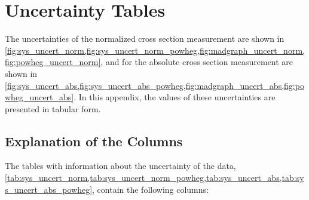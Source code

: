\chapter{Uncertainty Tables}
\label{app:uncertainty_tables}

The uncertainties of the normalized cross section measurement are shown in
\cref{fig:sys_uncert_norm,fig:sys_uncert_norm_powheg,fig:madgraph_uncert_norm,fig:powheg_uncert_norm},
and for the absolute cross section measurement are shown in
\cref{fig:sys_uncert_abs,fig:sys_uncert_abs_powheg,fig:madgraph_uncert_abs,fig:powheg_uncert_abs}.
In this appendix, the values of these uncertainties are presented in tabular
form.

\section{Explanation of the Columns}

The tables with information about the uncertainty of the data,
\cref{tab:sys_uncert_norm,tab:sys_uncert_norm_powheg,tab:sys_uncert_abs,tab:sys_uncert_abs_powheg},
contain the following columns:

